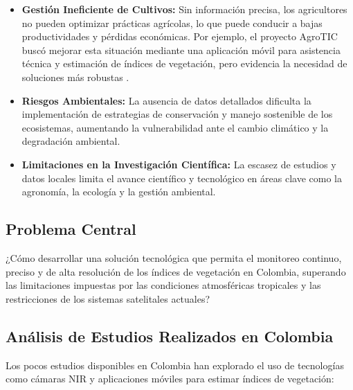 \begin{itemize}
    \item \textbf{Gestión Ineficiente de Cultivos:} Sin información precisa, los agricultores no pueden optimizar prácticas agrícolas, lo que puede conducir a bajas productividades y pérdidas económicas. Por ejemplo, el proyecto AgroTIC buscó mejorar esta situación mediante una aplicación móvil para asistencia técnica y estimación de índices de vegetación, pero evidencia la necesidad de soluciones más robustas \cite{Camacho2018Smartphone-basedAgroTICi}.

    \item \textbf{Riesgos Ambientales:} La ausencia de datos detallados dificulta la implementación de estrategias de conservación y manejo sostenible de los ecosistemas, aumentando la vulnerabilidad ante el cambio climático y la degradación ambiental.

    \item \textbf{Limitaciones en la Investigación Científica:} La escasez de estudios y datos locales limita el avance científico y tecnológico en áreas clave como la agronomía, la ecología y la gestión ambiental.
\end{itemize}

\subsection*{Problema Central}

¿Cómo desarrollar una solución tecnológica que permita el monitoreo continuo, preciso y de alta resolución de los índices de vegetación en Colombia, superando las limitaciones impuestas por las condiciones atmosféricas tropicales y las restricciones de los sistemas satelitales actuales?

\subsection*{Análisis de Estudios Realizados en Colombia}

Los pocos estudios disponibles en Colombia han explorado el uso de tecnologías como cámaras NIR y aplicaciones móviles para estimar índices de vegetación:

